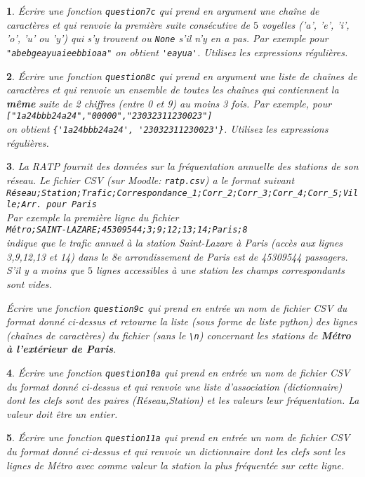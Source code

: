 \documentclass[10pt]{article}
\newtheorem{exi}{}
\newenvironment{exo}{\begin{exi}\em}{\end{exi}}
\begin{document}
\vspace*{-2ex}
\begin{exo}
    Écrire une fonction {\tt question7c}
qui prend en argument une chaîne de caractères et qui renvoie
la première suite consécutive de $5$ voyelles ('a', 'e', 'i', 'o', 'u' ou 'y')
qui s'y trouvent ou \verb+None+
s'il n'y en a pas.
Par exemple pour \verb+"abebgeayuaieebbioaa"+ on obtient
\verb+'eayua'+. Utilisez les expressions régulières.
\end{exo}
\vspace*{-2ex}
\begin{exo}
    Écrire une fonction {\tt question8c} qui prend en argument une liste
de chaînes de caractères et qui renvoie un ensemble de toutes les chaînes
qui contiennent la {\bf même} suite de 2
chiffres (entre 0 et 9) au moins 3 fois.
Par exemple, pour \verb+["1a24bbb24a24","00000","23032311230023"]+\\
on obtient \verb+{'1a24bbb24a24', '23032311230023'}+.
Utilisez les expressions régulières.
\end{exo}
\vspace*{-2ex}
\begin{exo}
    La RATP fournit des données sur la fréquentation annuelle des stations de son réseau. Le fichier CSV (sur Moodle: \verb+ratp.csv+) a le format suivant\\
\verb+Réseau;Station;Trafic;Correspondance_1;Corr_2;Corr_3;Corr_4;Corr_5;Ville;Arr. pour Paris+\\
Par exemple la première ligne du fichier\\
\verb+Métro;SAINT-LAZARE;45309544;3;9;12;13;14;Paris;8+\\
indique que le trafic annuel à la station Saint-Lazare à Paris (accès aux lignes 3,9,12,13 et 14) dans le 8e arrondissement de Paris est de 45309544 passagers. S'il y a moins que $5$ lignes accessibles à une station les champs correspondants sont vides. 

Écrire une fonction {\tt question9c} qui prend en entrée un nom de fichier CSV
du format donné ci-dessus
et retourne la liste (sous forme de liste python) des lignes (chaînes
de caractères) du fichier (sans le \verb+\n+)
concernant les stations de {\bf Métro à l'extérieur de Paris}.
\end{exo}
\vspace*{-2ex}
\begin{exo}
    Écrire une fonction {\tt question10a} qui prend en entrée un nom de fichier CSV
du format donné ci-dessus
et qui renvoie une liste d'association (dictionnaire) dont les clefs sont
des paires (Réseau,Station) et les valeurs leur fréquentation.
La valeur doit être un entier.
\end{exo}
\vspace*{-2ex}
\begin{exo}
    Écrire une fonction {\tt question11a} qui prend en entrée un nom de fichier CSV
du format donné ci-dessus et qui renvoie un dictionnaire dont les clefs sont
les lignes de Métro
avec comme valeur la station la plus fréquentée sur cette ligne.
\end{exo}
\vspace*{-2ex}
\end{document}
